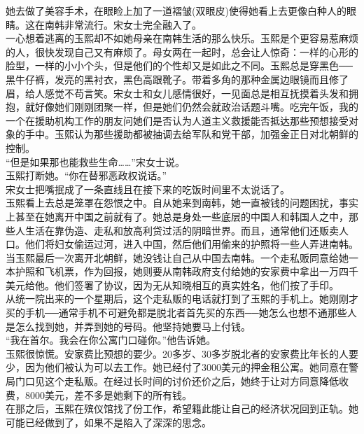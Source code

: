 她去做了美容手术，在眼睑上加了一道褶皱(双眼皮)使得她看上去更像白种人的眼睛。这在南韩非常流行。宋女士完全融入了。\\

一心想着逃离的玉熙却不如她母亲在南韩生活的那么快乐。玉熙是个更容易惹麻烦的人，很快发现自己又有麻烦了。母女两在一起时，总会让人惊奇：一样的心形的脸型，一样的小小个头，但是他们的个性却又是如此之不同。玉熙总是穿黑色──黑牛仔裤，发亮的黑衬衣，黑色高跟靴子。带着多角的那种金属边眼镜而且修了眉，给人感觉不苟言笑。宋女士和女儿感情很好，一见面总是相互抚摸着头发和拥抱，就好像她们刚刚团聚一样，但是她们仍然会就政治话题斗嘴。吃完午饭，我的一个在援助机构工作的朋友问她们是否认为人道主义救援能否抵达那些预想接受对象的手中。玉熙认为那些援助都被抽调去给军队和党干部，加强金正日对北朝鲜的控制。\\

“但是如果那也能救些生命……”宋女士说。\\

玉熙打断她。“你在替邪恶政权说话。”\\

宋女士把嘴抿成了一条直线且在接下来的吃饭时间里不太说话了。\\

玉熙看上去总是笼罩在怨恨之中。自从她来到南韩，她一直被钱的问题困扰，事实上甚至在她离开中国之前就有了。她总是身处一些底层的中国人和韩国人之中，那些人生活在靠伪造、走私和放高利贷过活的阴暗世界。而且，通常他们还贩卖人口。他们将妇女偷运过河，进入中国，然后他们用偷来的护照将一些人弄进南韩。当玉熙最后一次离开北朝鲜，她没钱让自己从中国去南韩。一个走私贩同意给她一本护照和飞机票，作为回报，她则要从南韩政府支付给她的安家费中拿出一万四千美元给他。他们签署了协议，因为无从知晓相互的真实姓名，他们按了手印。\\

从统一院出来的一个星期后，这个走私贩的电话就打到了玉熙的手机上。她刚刚才买的手机──通常手机不可避免都是脱北者首先买的东西──她怎么也想不通那些人是怎么找到她，并弄到她的号码。他坚持她要马上付钱。\\

“我在首尔。我会在你公寓门口碰你。”他告诉她。\\

玉熙很惊慌。安家费比预想的要少。20多岁、30多岁脱北者的安家费比年长的人要少，因为他们被认为可以去工作。她已经付了3000美元的押金租公寓。她同意在警局门口见这个走私贩。在经过长时间的讨价还价之后，她终于让对方同意降低收费，8000美元，差不多是她剩下的所有钱。\\

在那之后，玉熙在殡仪馆找了份工作，希望籍此能让自己的经济状况回到正轨。她可能已经做到了，如果不是陷入了深深的思念。\\

